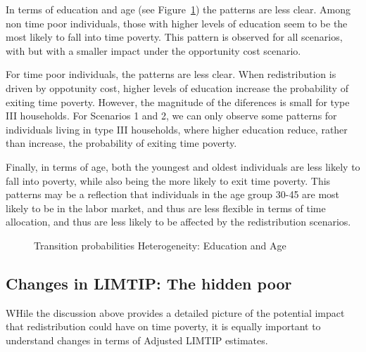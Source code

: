 \documentclass[
  11pt,
]{article}
\begin{document}
In terms of education and age (see Figure~\ref{fig-tran_by_group2}) the
patterns are less clear. Among non time poor individuals, those with
higher levels of education seem to be the most likely to fall into time
poverty. This pattern is observed for all scenarios, with but with a
smaller impact under the opportunity cost scenario.

For time poor individuals, the patterns are less clear. When
redistribution is driven by oppotunity cost, higher levels of education
increase the probability of exiting time poverty. However, the magnitude
of the diferences is small for type III households. For Scenarios 1 and
2, we can only observe some patterns for individuals living in type III
households, where higher education reduce, rather than increase, the
probability of exiting time poverty.

Finally, in terms of age, both the youngest and oldest individuals are
less likely to fall into poverty, while also being the more likely to
exit time poverty. This patterns may be a reflection that individuals in
the age group 30-45 are most likely to be in the labor market, and thus
are less flexible in terms of time allocation, and thus are less likely
to be affected by the redistribution scenarios.

\begin{figure}[H]


\caption{\label{fig-tran_by_group2}Transition probabilities
Heterogeneity: Education and Age}

\end{figure}%

\subsection{Changes in LIMTIP: The hidden
poor}\label{changes-in-limtip-the-hidden-poor}

WHile the discussion above provides a detailed picture of the potential
impact that redistribution could have on time poverty, it is equally
important to understand changes in terms of Adjusted LIMTIP estimates.
\end{document}
